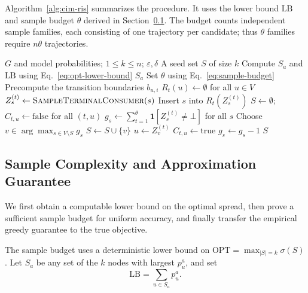 \documentclass[sigconf]{acmart}
\newcommand{\CIMRIS}{\textsc{CIM-RIS}}
\begin{document}
Algorithm~\ref{alg:cim-ris} summarizes the procedure. It uses the
lower bound $\mathrm{LB}$ and sample budget $\theta$ derived in
Section~\ref{sec:theoretical-guarantees}. The budget counts independent
sample families, each consisting of one trajectory per candidate;
thus $\theta$ families require $n\theta$ trajectories.

\begin{algorithm}[t]
\caption{\CIMRIS{}: Trajectory Sampling and Coverage Greedy}
\label{alg:cim-ris}
\begin{algorithmic}[1]
\Require $G$ and model probabilities; $1\le k\le n$; $\varepsilon,\delta$
\Ensure A seed set $S$ of size $k$
\State Compute $S_a$ and $\mathrm{LB}$ using Eq.~\eqref{eq:opt-lower-bound}
  \State \Return $S_a$
\EndIf
\State Set $\theta$ using Eq.~\eqref{eq:sample-budget}
\State Precompute the transition boundaries $b_{u,i}$
  \State $R_t(u)\gets\emptyset$ for all $u\in V$
    \State $Z_s^{(t)}\gets\Call{SampleTerminalConsumer}{s}$
      \State Insert $s$ into $R_t(Z_s^{(t)})$
    \EndIf
  \EndFor
\EndFor
\State $S\gets\emptyset$; $C_{t,u}\gets\mathrm{false}$ for all $(t,u)$
\State $g_s\gets\sum_{t=1}^\theta\mathbf1[Z_s^{(t)}\ne\bot]$ for all $s$
  \State Choose $v\in\arg\max_{s\in V\setminus S}g_s$
  \State $S\gets S\cup\{v\}$
    \State $u\gets Z_v^{(t)}$
        \State $C_{t,u}\gets\mathrm{true}$
          \State $g_s\gets g_s-1$
        \EndFor
      \EndIf
    \EndIf
  \EndFor
\EndFor
\State \Return $S$
\end{algorithmic}
\end{algorithm}

\subsection{Sample Complexity and Approximation Guarantee}
\label{sec:theoretical-guarantees}

We first obtain a computable lower bound on the optimal spread,
then prove a sufficient sample budget for uniform accuracy, and
finally transfer the empirical greedy guarantee to the true objective.

The sample budget uses a deterministic lower bound on
$\mathrm{OPT}=\max_{|S|=k}\sigma(S)$. Let $S_a$ be any set of
the $k$ nodes with largest $p_u^a$, and set
\begin{equation}
\label{eq:opt-lower-bound}
  \mathrm{LB}=\sum_{u\in S_a}p_u^a.
\end{equation}
\end{document}

